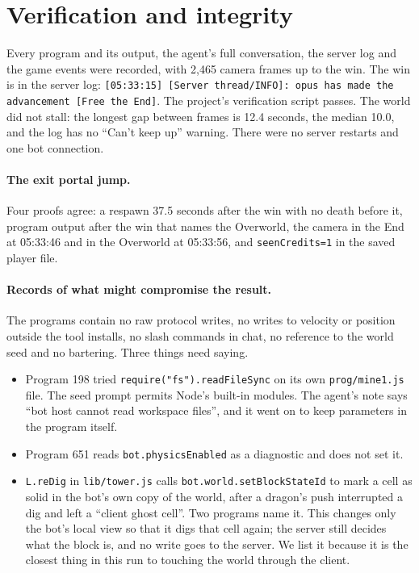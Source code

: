 \documentclass[11pt,a4paper]{article}
\begin{document}
\section{Verification and integrity}
\label{sec:verify}

Every program and its output, the agent's full conversation, the server log and the game events were recorded, with 2,465 camera frames up to the win. The win is in the server log: \texttt{[05:33:15] [Server thread/INFO]: opus has made the advancement [Free the End]}. The project's verification script passes. The world did not stall: the longest gap between frames is 12.4 seconds, the median 10.0, and the log has no ``Can't keep up'' warning. There were no server restarts and one bot connection.

\paragraph{The exit portal jump.} Four proofs agree: a respawn 37.5 seconds after the win with no death before it, program output after the win that names the Overworld, the camera in the End at 05:33:46 and in the Overworld at 05:33:56, and \texttt{seenCredits=1} in the saved player file.

\paragraph{Records of what might compromise the result.} The programs contain no raw protocol writes, no writes to velocity or position outside the tool installs, no slash commands in chat, no reference to the world seed and no bartering. Three things need saying.

\begin{itemize}
  \item Program 198 tried \texttt{require("fs").readFileSync} on its own \texttt{prog/mine1.js} file. The seed prompt permits Node's built-in modules. The agent's note says ``bot host cannot read workspace files'', and it went on to keep parameters in the program itself.
  \item Program 651 reads \texttt{bot.physicsEnabled} as a diagnostic and does not set it.
  \item \texttt{L.reDig} in \texttt{lib/tower.js} calls \texttt{bot.world.setBlockStateId} to mark a cell as solid in the bot's own copy of the world, after a dragon's push interrupted a dig and left a ``client ghost cell''. Two programs name it. This changes only the bot's local view so that it digs that cell again; the server still decides what the block is, and no write goes to the server. We list it because it is the closest thing in this run to touching the world through the client.
\end{itemize}
\end{document}
